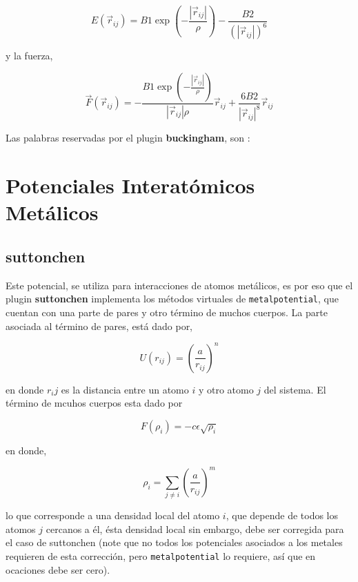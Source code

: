 $$E(\vec{r}_{ij}) = B1 \exp\left(-\frac{|\vec{r}_{ij}|}{\rho}\right) - \frac{B2}{(|\vec{r}_{ij}|)^6}$$

y la fuerza,

$$\vec{F}(\vec{r}_{ij}) = -\frac{B1\exp\left(-\frac{|\vec{r}_{ij}|}{\rho}\right)}{|\vec{r}_{ij}|\rho}\vec{r}_{ij} + \frac{6B2}{|\vec{r}_{ij}|^8}\vec{r}_{ij}$$

Las palabras reservadas por el plugin \textbf{buckingham}, son :


\section{Potenciales Interat\'omicos Met\'alicos}
\subsection{suttonchen}
Este potencial, se utiliza para interacciones de atomos met\'alicos, es por eso que el plugin \textbf{suttonchen} implementa los m\'etodos virtuales de \verb|metalpotential|, que cuentan con una parte de pares y otro t\'ermino de muchos cuerpos. La parte asociada al t\'ermino de pares, est\'a dado por,

$$U(r_{ij}) = \left(\frac{a}{r_{ij}}\right)^n$$

en donde $r_ij$ es la distancia entre un atomo $i$ y otro atomo $j$ del sistema. El t\'ermino de mcuhos cuerpos esta dado por

$$F(\rho_{i}) = -c\epsilon\sqrt{\rho_i}$$

en donde,

$$\rho_i = \sum_{j\neq i} \left(\frac{a}{r_{ij}}\right)^m$$

lo que corresponde a una densidad local del atomo $i$, que depende de todos los atomos $j$ cercanos a \'el, \'esta densidad local sin embargo, debe ser corregida para el caso de suttonchen (note que no todos los potenciales asociados a los metales requieren de esta correcci\'on, pero \verb|metalpotential| lo requiere, as\'i que en ocaciones debe ser cero).

